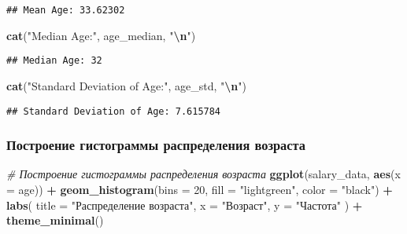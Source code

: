 \documentclass[
]{article}
\newenvironment{Shaded}{\begin{snugshade}}{\end{snugshade}}
\newcommand{\AttributeTok}[1]{\textcolor[rgb]{0.13,0.29,0.53}{#1}}
\newcommand{\CommentTok}[1]{\textcolor[rgb]{0.56,0.35,0.01}{\textit{#1}}}
\newcommand{\DecValTok}[1]{\textcolor[rgb]{0.00,0.00,0.81}{#1}}
\newcommand{\FunctionTok}[1]{\textcolor[rgb]{0.13,0.29,0.53}{\textbf{#1}}}
\newcommand{\NormalTok}[1]{#1}
\newcommand{\SpecialCharTok}[1]{\textcolor[rgb]{0.81,0.36,0.00}{\textbf{#1}}}
\newcommand{\StringTok}[1]{\textcolor[rgb]{0.31,0.60,0.02}{#1}}
\begin{document}
\begin{verbatim}
## Mean Age: 33.62302
\end{verbatim}

\begin{Shaded}
\begin{Highlighting}[]
\FunctionTok{cat}\NormalTok{(}\StringTok{"Median Age:"}\NormalTok{, age\_median, }\StringTok{"}\SpecialCharTok{\textbackslash{}n}\StringTok{"}\NormalTok{)}
\end{Highlighting}
\end{Shaded}

\begin{verbatim}
## Median Age: 32
\end{verbatim}

\begin{Shaded}
\begin{Highlighting}[]
\FunctionTok{cat}\NormalTok{(}\StringTok{"Standard Deviation of Age:"}\NormalTok{, age\_std, }\StringTok{"}\SpecialCharTok{\textbackslash{}n}\StringTok{"}\NormalTok{)}
\end{Highlighting}
\end{Shaded}

\begin{verbatim}
## Standard Deviation of Age: 7.615784
\end{verbatim}

\subsubsection{Построение гистограммы распределения
возраста}\label{ux43fux43eux441ux442ux440ux43eux435ux43dux438ux435-ux433ux438ux441ux442ux43eux433ux440ux430ux43cux43cux44b-ux440ux430ux441ux43fux440ux435ux434ux435ux43bux435ux43dux438ux44f-ux432ux43eux437ux440ux430ux441ux442ux430}

\begin{Shaded}
\begin{Highlighting}[]
\CommentTok{\# Построение гистограммы распределения возраста}
\FunctionTok{ggplot}\NormalTok{(salary\_data, }\FunctionTok{aes}\NormalTok{(}\AttributeTok{x =}\NormalTok{ age)) }\SpecialCharTok{+}
  \FunctionTok{geom\_histogram}\NormalTok{(}\AttributeTok{bins =} \DecValTok{20}\NormalTok{, }\AttributeTok{fill =} \StringTok{"lightgreen"}\NormalTok{, }\AttributeTok{color =} \StringTok{"black"}\NormalTok{) }\SpecialCharTok{+}
  \FunctionTok{labs}\NormalTok{(}
    \AttributeTok{title =} \StringTok{"Распределение возраста"}\NormalTok{,}
    \AttributeTok{x =} \StringTok{"Возраст"}\NormalTok{,}
    \AttributeTok{y =} \StringTok{"Частота"}
\NormalTok{  ) }\SpecialCharTok{+}
  \FunctionTok{theme\_minimal}\NormalTok{()}
\end{Highlighting}
\end{Shaded}
\end{document}

